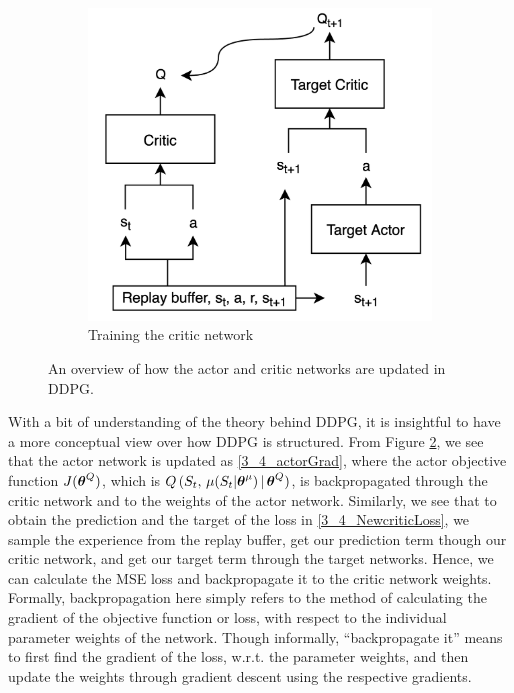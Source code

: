 \begin{figure}[htb]
\begin{subfigure}[b]{0.6\textwidth}
        \includegraphics[width=\textwidth]{figures/3_/3_4_training_critic.png}
        \caption{Training the critic network}
        \label{fig:3_4_critic}
    \end{subfigure}
    \hfill
    \caption{An overview of how the actor and critic networks are updated in DDPG.}
    \label{fig:3_4_training}
\end{figure}
With a bit of understanding of the theory behind DDPG, it is insightful to have a more conceptual view over how DDPG is structured. From Figure \ref{fig:3_4_training}, we see that the actor network is updated as \eqref{3_4_actorGrad}, where the actor objective function $J(\boldsymbol{\theta}^Q)$, which is $Q\,(S_t,\, \mu(S_t|\boldsymbol{\theta}^\mu)\,|\, \boldsymbol{\theta}^Q)$, is backpropagated through the critic network and to the weights of the actor network. Similarly, we see that to obtain the prediction and the target of the loss in \eqref{3_4_NewcriticLoss}, we  sample the experience from the replay buffer, get our prediction term though our critic network, and get our target term through the target networks. Hence, we can calculate the MSE loss and backpropagate it to the critic network weights. Formally, backpropagation here simply refers to the method of calculating the gradient of the objective function or loss, with respect to the individual parameter weights of the network. Though informally, ``backpropagate it'' means to first find the gradient of the loss, w.r.t. the parameter weights, and then update the weights through gradient descent using the respective gradients.

